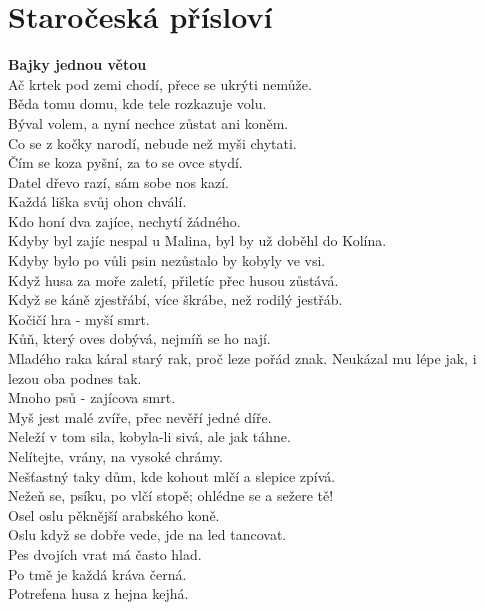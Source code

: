 \section{Staročeská přísloví}
\begin{multicols}{2}

\noindent
{\large\bf Bajky jednou větou}\\[1 mm]
Ač krtek pod zemi chodí, přece se ukrýti nemůže.\\
Běda tomu domu, kde tele rozkazuje volu.\\
Býval volem, a nyní nechce zůstat ani koněm.\\
Co se z kočky narodí, nebude než myši chytati.\\
Čím se koza pyšní, za to se ovce stydí.\\
Datel dřevo razí, sám sobe nos kazí.\\
Každá liška svůj ohon chválí.\\
Kdo honí dva zajíce, nechytí žádného.\\
Kdyby byl zajíc nespal u Malina, byl by už doběhl do Kolína.\\
Kdyby bylo po vůli psin nezůstalo by kobyly ve vsi.\\
Když husa za moře zaletí, přiletíc přec husou zůstává.\\
Když se káně zjestřábí, více škrábe, než rodilý jestřáb.\\
Kočičí hra - myší smrt.\\
Kůň, který oves dobývá, nejmíň se ho nají.\\
Mladého raka káral starý rak, proč leze pořád znak. Neukázal
mu lépe jak, i lezou oba podnes tak.\\
Mnoho psů - zajícova smrt.\\
Myš jest malé zvíře, přec nevěří jedné díře.\\
Neleží v tom sila, kobyla-li sivá, ale jak táhne.\\
Nelítejte, vrány, na vysoké chrámy.\\
Nešťastný taky dům, kde kohout mlčí a slepice zpívá.\\
Nežeň se, psíku, po vlčí stopě; ohlédne se a sežere tě!\\
Osel oslu pěknější arabského koně.\\
Oslu když se dobře vede, jde na led tancovat.\\
Pes dvojích vrat má často hlad.\\
Po tmě je každá kráva černá.\\
Potrefena husa z hejna kejhá.\\

\end{multicols}
